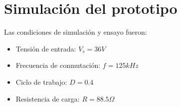 \section{Simulación del prototipo}

Las condiciones de simulación y ensayo fueron:

\begin{itemize}
    \item Tensión de entrada: $V_s=36V$
    \item Frecuencia de conmutación: $f=125kHz$
    \item Ciclo de trabajo: $D=0.4$
    \item Resistencia de carga: $R=88.5\Omega$
\end{itemize}











